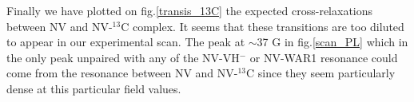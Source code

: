 \documentclass{article}
\begin{document}
Finally we have plotted on fig.\ref{transis_13C} the expected cross-relaxations between NV and NV-$^{13}$C complex. It seems that these transitions are too diluted to appear in our experimental scan. The peak at $\sim$37 G in fig.\ref{scan_PL} which in the only peak unpaired with any of the NV-VH$^-$ or NV-WAR1 resonance could come from the resonance between NV and NV-$^{13}$C since they seem particularly dense at this particular field values.


\end{document}
